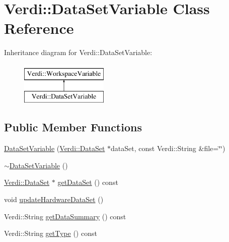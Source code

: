 \hypertarget{class_verdi_1_1_data_set_variable}{\section{\-Verdi\-:\-:\-Data\-Set\-Variable \-Class \-Reference}
\label{class_verdi_1_1_data_set_variable}
}
\-Inheritance diagram for \-Verdi\-:\-:\-Data\-Set\-Variable\-:\begin{figure}[H]
\begin{center}
\leavevmode
\includegraphics[height=2.000000cm]{class_verdi_1_1_data_set_variable}
\end{center}
\end{figure}
\subsection*{\-Public \-Member \-Functions}
\begin{DoxyCompactItemize}
\item 
\hyperlink{class_verdi_1_1_data_set_variable_a6441076b006af6e020be9282fe36ba1c}{\-Data\-Set\-Variable} (\hyperlink{class_verdi_1_1_data_set}{\-Verdi\-::\-Data\-Set} $\ast$data\-Set, const \-Verdi\-::\-String \&file=\char`\"{}\char`\"{})
\item 
\hyperlink{class_verdi_1_1_data_set_variable_a0d9f06e7f8adf609eae41ff89d8e367c}{$\sim$\-Data\-Set\-Variable} ()
\item 
\hyperlink{class_verdi_1_1_data_set}{\-Verdi\-::\-Data\-Set} $\ast$ \hyperlink{class_verdi_1_1_data_set_variable_a4a703b03a6d7d70ba37dea54ebe67db3}{get\-Data\-Set} () const 
\item 
void \hyperlink{class_verdi_1_1_data_set_variable_a6d7fe75406d9274e40ff958d2037bb7c}{update\-Hardware\-Data\-Set} ()
\item 
\-Verdi\-::\-String \hyperlink{class_verdi_1_1_data_set_variable_a301a71bf58f60f5926f8d1358e35f907}{get\-Data\-Summary} () const 
\item 
\-Verdi\-::\-String \hyperlink{class_verdi_1_1_data_set_variable_a5aa9a5a9b13815a7d4a88ca2c172d0f8}{get\-Type} () const 
\end{DoxyCompactItemize}

